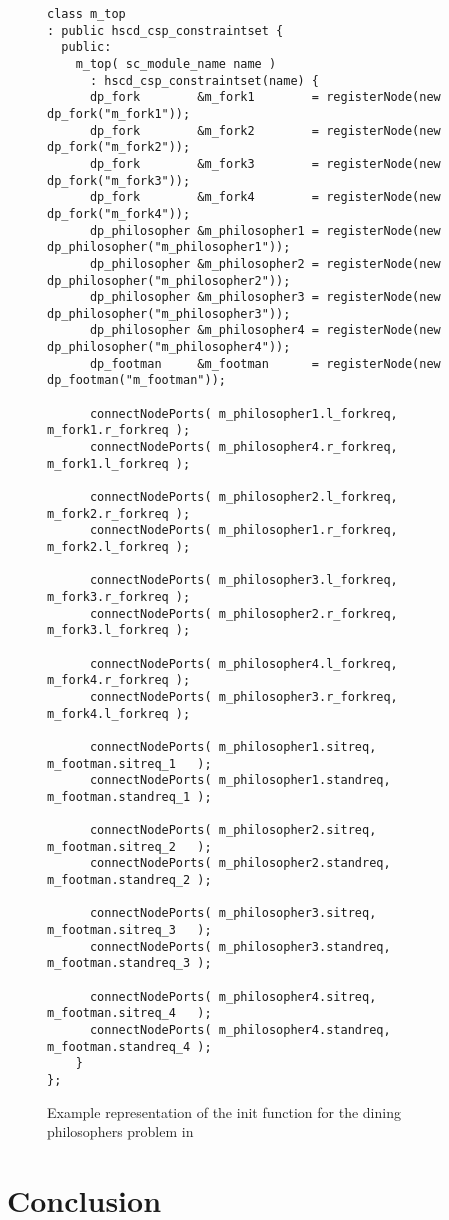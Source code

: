 \begin{figure}
\centering
\begin{verbatim}
class m_top
: public hscd_csp_constraintset {
  public:
    m_top( sc_module_name name )
      : hscd_csp_constraintset(name) {
      dp_fork        &m_fork1        = registerNode(new dp_fork("m_fork1"));
      dp_fork        &m_fork2        = registerNode(new dp_fork("m_fork2"));
      dp_fork        &m_fork3        = registerNode(new dp_fork("m_fork3"));
      dp_fork        &m_fork4        = registerNode(new dp_fork("m_fork4"));
      dp_philosopher &m_philosopher1 = registerNode(new dp_philosopher("m_philosopher1"));
      dp_philosopher &m_philosopher2 = registerNode(new dp_philosopher("m_philosopher2"));
      dp_philosopher &m_philosopher3 = registerNode(new dp_philosopher("m_philosopher3"));
      dp_philosopher &m_philosopher4 = registerNode(new dp_philosopher("m_philosopher4"));
      dp_footman     &m_footman      = registerNode(new dp_footman("m_footman"));
      
      connectNodePorts( m_philosopher1.l_forkreq, m_fork1.r_forkreq );
      connectNodePorts( m_philosopher4.r_forkreq, m_fork1.l_forkreq );
      
      connectNodePorts( m_philosopher2.l_forkreq, m_fork2.r_forkreq );
      connectNodePorts( m_philosopher1.r_forkreq, m_fork2.l_forkreq );
      
      connectNodePorts( m_philosopher3.l_forkreq, m_fork3.r_forkreq );
      connectNodePorts( m_philosopher2.r_forkreq, m_fork3.l_forkreq );
      
      connectNodePorts( m_philosopher4.l_forkreq, m_fork4.r_forkreq );
      connectNodePorts( m_philosopher3.r_forkreq, m_fork4.l_forkreq );
      
      connectNodePorts( m_philosopher1.sitreq,   m_footman.sitreq_1   );
      connectNodePorts( m_philosopher1.standreq, m_footman.standreq_1 );

      connectNodePorts( m_philosopher2.sitreq,   m_footman.sitreq_2   );
      connectNodePorts( m_philosopher2.standreq, m_footman.standreq_2 );

      connectNodePorts( m_philosopher3.sitreq,   m_footman.sitreq_3   );
      connectNodePorts( m_philosopher3.standreq, m_footman.standreq_3 );

      connectNodePorts( m_philosopher4.sitreq,   m_footman.sitreq_4   );
      connectNodePorts( m_philosopher4.standreq, m_footman.standreq_4 );
    }
};
\end{verbatim}
\caption{\label{dining-philosophers-csp-systemoc}
  Example representation of the init function for the
  dining philosophers problem in \SysteMoC{}}
\end{figure}

\section{Conclusion}\label{conclusion}



\clearpage
\appendix




